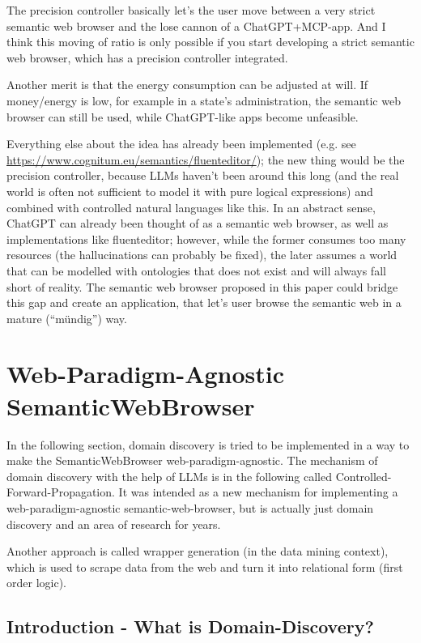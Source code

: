 \documentclass[12pt,a4paper]{article}
\begin{document}
The precision controller basically let's the user move between a very strict semantic web browser and the lose cannon of a ChatGPT+MCP-app. And I think this moving of ratio is only possible if you start developing a strict semantic web browser, which has a precision controller integrated.

Another merit is that the energy consumption can be adjusted at will. If money/energy is low, for example in a state's administration, the semantic web browser can still be used, while ChatGPT-like apps become unfeasible.

Everything else about the idea has already been implemented (e.g. see \url{https://www.cognitum.eu/semantics/fluenteditor/}); the new thing would be the precision controller, because LLMs haven't been around this long (and the real world is often not sufficient to model it with pure logical expressions) and combined with controlled natural languages like this. In an abstract sense, ChatGPT can already been thought of as a semantic web browser, as well as implementations like fluenteditor; however, while the former consumes too many resources (the hallucinations can probably be fixed), the later assumes a world that can be modelled with ontologies that does not exist and will always fall short of reality. The semantic web browser proposed in this paper could bridge this gap and create an application, that let's user browse the semantic web in a mature (``mündig'') way.

\newpage

\section{Web-Paradigm-Agnostic SemanticWebBrowser}

In the following section, domain discovery is tried to be implemented in a way to make the SemanticWebBrowser web-paradigm-agnostic.
The mechanism of domain discovery with the help of LLMs is in the following called Controlled-Forward-Propagation.
It was intended as a new mechanism for implementing a web-paradigm-agnostic semantic-web-browser, but is actually just domain discovery and an area of research for years.

Another approach is called wrapper generation (in the data mining context), which is used to scrape data from the web and turn it into relational form (first order logic).

\subsection{Introduction - What is Domain-Discovery?}
\end{document}
